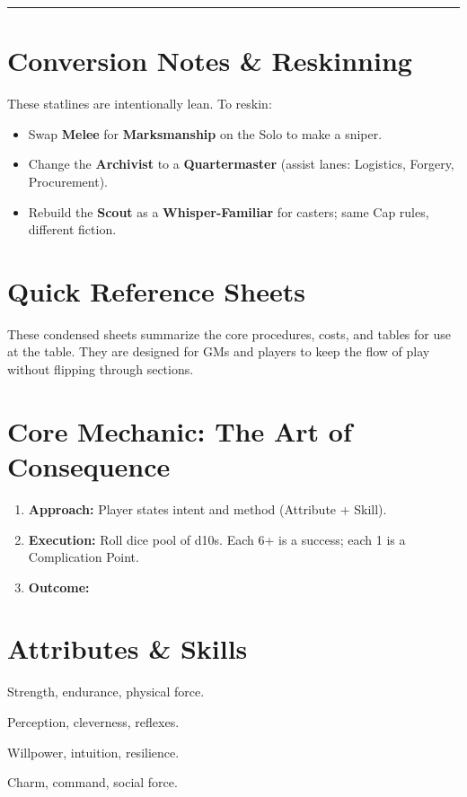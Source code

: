 \documentclass[12pt]{article}
\begin{document}
\bigskip
\hrule
\bigskip

\section{Conversion Notes \& Reskinning}
These statlines are intentionally lean. To reskin:
\begin{itemize}
  \item Swap \textbf{Melee} for \textbf{Marksmanship} on the Solo to make a sniper.
  \item Change the \textbf{Archivist} to a \textbf{Quartermaster} (assist lanes: Logistics, Forgery, Procurement).
  \item Rebuild the \textbf{Scout} as a \textbf{Whisper-Familiar} for casters; same Cap rules, different fiction.
\end{itemize}

\section{Quick Reference Sheets}

These condensed sheets summarize the core procedures, costs, and tables for use at the table.  
They are designed for GMs and players to keep the flow of play without flipping through sections.

\section*{Core Mechanic: The Art of Consequence}
\begin{enumerate}
  \item \textbf{Approach:} Player states intent and method (Attribute + Skill).
  \item \textbf{Execution:} Roll dice pool of d10s. Each 6+ is a success; each 1 is a Complication Point.
  \item \textbf{Outcome:}  
\end{enumerate}

\section*{Attributes \& Skills}
\begin{description}[leftmargin=2cm]
  \item[Body] Strength, endurance, physical force.  
  \item[Wits] Perception, cleverness, reflexes.  
  \item[Spirit] Willpower, intuition, resilience.  
  \item[Presence] Charm, command, social force.  
\end{description}
\end{document}

